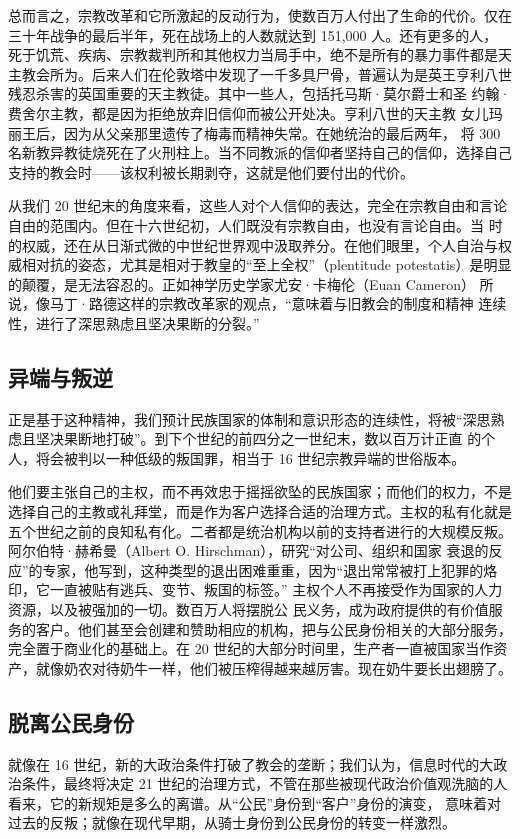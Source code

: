 总而言之，宗教改革和它所激起的反动行为，使数百万人付出了生命的代价。仅在三十年战争的最后半年，死在战场上的人数就达到 151,000 人。还有更多的人， 死于饥荒、疾病、宗教裁判所和其他权力当局手中，绝不是所有的暴力事件都是天主教会所为。后来人们在伦敦塔中发现了一千多具尸骨，普遍认为是英王亨利八世残忍杀害的英国重要的天主教徒。其中一些人，包括托马斯·莫尔爵士和圣 约翰·费舍尔主教，都是因为拒绝放弃旧信仰而被公开处决。亨利八世的天主教 女儿玛丽王后，因为从父亲那里遗传了梅毒而精神失常。在她统治的最后两年， 将 300 名新教异教徒烧死在了火刑柱上。当不同教派的信仰者坚持自己的信仰，选择自己支持的教会时——该权利被长期剥夺，这就是他们要付出的代价。

从我们 20 世纪末的角度来看，这些人对个人信仰的表达，完全在宗教自由和言论自由的范围内。但在十六世纪初，人们既没有宗教自由，也没有言论自由。当  时的权威，还在从日渐式微的中世纪世界观中汲取养分。在他们眼里，个人自治与权威相对抗的姿态，尤其是相对于教皇的“至上全权”（plentitude potestatis）是明显的颠覆，是无法容忍的。正如神学历史学家尤安·卡梅伦（Euan Cameron） 所说，像马丁·路德这样的宗教改革家的观点，“意味着与旧教会的制度和精神 连续性，进行了深思熟虑且坚决果断的分裂。” 

\subsection{异端与叛逆}
正是基于这种精神，我们预计民族国家的体制和意识形态的连续性，将被“深思熟虑且坚决果断地打破”。到下个世纪的前四分之一世纪末，数以百万计正直 的个人，将会被判以一种低级的叛国罪，相当于 16 世纪宗教异端的世俗版本。

他们要主张自己的主权，而不再效忠于摇摇欲坠的民族国家；而他们的权力，不是选择自己的主教或礼拜堂，而是作为客户选择合适的治理方式。主权的私有化就是五个世纪之前的良知私有化。二者都是统治机构以前的支持者进行的大规模反叛。阿尔伯特·赫希曼（Albert O. Hirschman），研究“对公司、组织和国家 衰退的反应”的专家，他写到，这种类型的退出困难重重，因为“退出常常被打上犯罪的烙印，它一直被贴有逃兵、变节、叛国的标签。” 主权个人不再接受作为国家的人力资源，以及被强加的一切。数百万人将摆脱公 民义务，成为政府提供的有价值服务的客户。他们甚至会创建和赞助相应的机构，把与公民身份相关的大部分服务，完全置于商业化的基础上。在 20 世纪的大部分时间里，生产者一直被国家当作资产，就像奶农对待奶牛一样，他们被压榨得越来越厉害。现在奶牛要长出翅膀了。

\subsection{脱离公民身份}
就像在 16 世纪，新的大政治条件打破了教会的垄断；我们认为，信息时代的大政治条件，最终将决定 21 世纪的治理方式，不管在那些被现代政治价值观洗脑的人看来，它的新规矩是多么的离谱。从“公民”身份到“客户”身份的演变， 意味着对过去的反叛；就像在现代早期，从骑士身份到公民身份的转变一样激烈。

